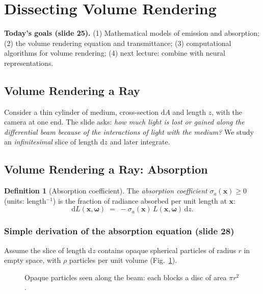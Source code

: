 \documentclass[11pt,a4paper]{article}
\newcommand{\x}{{\bm{x}}}
\newcommand{\w}{{\bm{\omega}}}
\theoremstyle{definition}
\newtheorem{definition}{Definition}[section]
\theoremstyle{plain}
\theoremstyle{remark}
\begin{document}
\section{Dissecting Volume Rendering}
\textbf{Today's goals (slide 25).} (1) Mathematical models of emission and absorption; (2) the volume rendering equation and transmittance; (3) computational algorithms for volume rendering; (4) next lecture: combine with neural representations.

\subsection{Volume Rendering a Ray}

Consider a thin cylinder of medium, cross-section $\mathrm dA$ and length $z$, with the camera at one end. The slide asks: \emph{how much light is lost or gained along the differential beam because of the interactions of light with the medium?} We study an \emph{infinitesimal} slice of length $\mathrm dz$ and later integrate.

\subsection{Volume Rendering a Ray: Absorption}

\begin{definition}[Absorption coefficient]\label{def:abs}
The \emph{absorption coefficient} $\sigma_a(\x)\ge 0$ (units: length$^{-1}$) is the fraction of radiance absorbed per unit length at $\x$:
\[
\mathrm dL(\x,\w)\;=\;-\sigma_a(\x)\,L(\x,\w)\,\mathrm dz .
\]
\end{definition}

\subsubsection*{Simple derivation of the absorption equation (slide 28)}
Assume the slice of length $\mathrm dz$ contains opaque spherical particles of radius $r$ in empty space, with $\rho$ particles per unit volume (Fig.~\ref{fig:particles}).

\begin{figure}[h]
\centering
{}
\caption{Opaque particles seen along the beam: each blocks a disc of area $\pi r^2$.}\label{fig:particles}
\end{figure}
\end{document}
